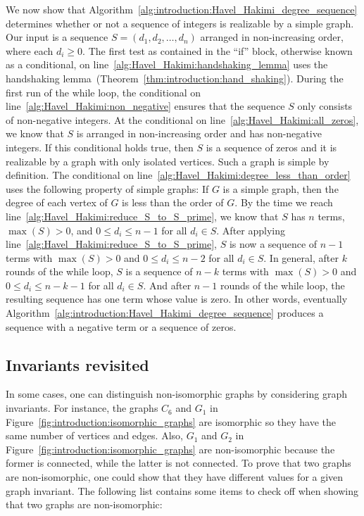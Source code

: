 We now show that
Algorithm~\ref{alg:introduction:Havel_Hakimi_degree_sequence}
determines whether or not a sequence of integers is realizable by a
simple graph. Our input is a sequence $S = (d_1, d_2, \dots, d_n)$
arranged in non-increasing order, where each $d_i \geq 0$. The first
test as contained in the ``if'' block, otherwise known as a
conditional, on line~\ref{alg:Havel_Hakimi:handshaking_lemma} uses the
handshaking
lemma~(Theorem~\ref{thm:introduction:hand_shaking}). During the first
run of the while loop, the conditional on
line~\ref{alg:Havel_Hakimi:non_negative} ensures that the sequence $S$
only consists of non-negative integers. At the conditional on
line~\ref{alg:Havel_Hakimi:all_zeros}, we know that $S$ is arranged in
non-increasing order and has non-negative integers. If this
conditional holds true, then $S$ is a sequence of zeros and it is
realizable by a graph with only isolated vertices. Such a graph is
simple by definition. The conditional on
line~\ref{alg:Havel_Hakimi:degree_less_than_order} uses the following
property of simple graphs: If $G$ is a simple graph, then the degree
of each vertex of $G$ is less than the order of $G$. By the time we
reach line~\ref{alg:Havel_Hakimi:reduce_S_to_S_prime}, we know that
$S$ has $n$ terms, $\max(S) > 0$, and $0 \leq d_i \leq n - 1$ for all
$d_i \in S$. After applying
line~\ref{alg:Havel_Hakimi:reduce_S_to_S_prime}, $S$ is now a sequence
of $n - 1$ terms with $\max(S) > 0$ and $0 \leq d_i \leq n - 2$ for all
$d_i \in S$. In general, after $k$ rounds of the while loop, $S$ is a
sequence of $n - k$ terms with $\max(S) > 0$ and
$0 \leq d_i \leq n - k - 1$ for all $d_i \in S$. And after $n - 1$
rounds of the while loop, the resulting sequence has one term whose
value is zero. In other words, eventually
Algorithm~\ref{alg:introduction:Havel_Hakimi_degree_sequence} produces
a sequence with a negative term or a sequence of zeros.



\subsection{Invariants revisited}

In some cases, one can distinguish non-isomorphic graphs by
considering graph invariants. For instance, the graphs $C_6$ and $G_1$
in Figure~\ref{fig:introduction:isomorphic_graphs} are isomorphic so
they have the same number of vertices and edges. Also, $G_1$ and $G_2$
in Figure~\ref{fig:introduction:isomorphic_graphs}  are non-isomorphic
because the former is connected, while the latter is not connected. To
prove that two graphs are non-isomorphic, one could show that they
have different values for a given graph invariant. The following list
contains some items to check off when showing that two graphs are
non-isomorphic:

